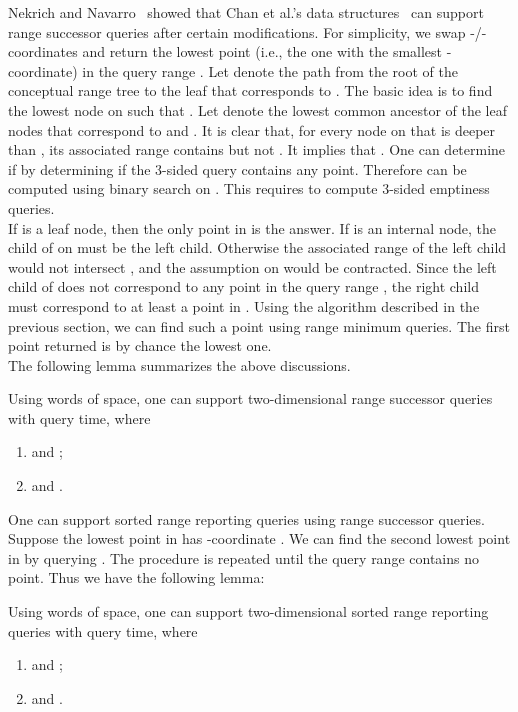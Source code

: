 \documentclass{llncs}
\begin{document}
\indent Nekrich and Navarro~\cite{DBLP:conf/swat/NekrichN12} showed that
Chan et al.'s data structures~\cite{DBLP:conf/compgeom/ChanLP11} can support range successor queries after certain modifications.
For simplicity, we swap -/-coordinates and return the lowest point (i.e., the one with the smallest -coordinate)
in the query range .
Let  denote the path from the root of the conceptual range tree  to the leaf that corresponds to .
The basic idea is to find the lowest node  on  such that .
Let  denote the lowest common ancestor of the leaf nodes that correspond to  and .
It is clear that, for every node  on  that is deeper than , its associated range contains  but not .
It implies that .
One can determine if  by determining if the 3-sided query contains any point.
Therefore  can be computed using binary search on .
This requires to compute  3-sided emptiness queries. \\
\indent If  is a leaf node, then the only point in  is the answer.
If  is an internal node, the child of  on  must be the left child.
Otherwise the associated range of the left child would not intersect ,
and the assumption on  would be contracted.
Since the left child of  does not correspond to any point in the query range ,
the right child must correspond to at least a point in .
Using the algorithm described in the previous section, we can find such a point using range minimum queries.
The first point returned is by chance the lowest one. \\
\indent The following lemma summarizes the above discussions.
\begin{lemma}
    Using  words of space,
    one can support two-dimensional range successor queries with  query time,
    where
    \begin{enumerate}
        \item  and ;
        \item  and .
    \end{enumerate}
\end{lemma}

One can support sorted range reporting queries using range successor queries.
Suppose the lowest point in  has -coordinate .
We can find the second lowest point in  by querying .
The procedure is repeated until the query range contains no point.
Thus we have the following lemma:
\begin{lemma}
    Using  words of space,
    one can support two-dimensional sorted range reporting queries with  query time,
    where
    \begin{enumerate}
        \item  and ;
        \item  and .
    \end{enumerate}
\end{lemma}
\end{document}
